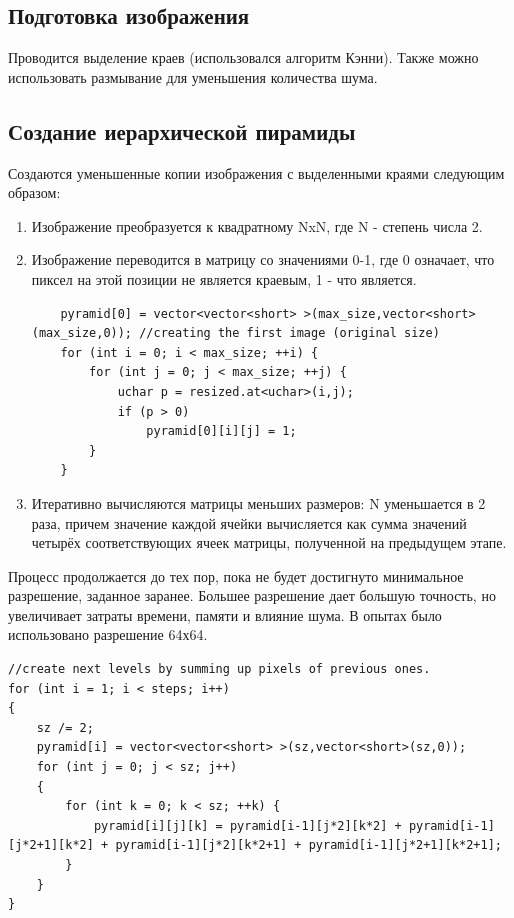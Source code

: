 \subsection{Подготовка изображения}
Проводится выделение краев (использовался алгоритм Кэнни). Также можно использовать размывание для уменьшения количества шума.
\subsection{Создание иерархической пирамиды}
Создаются уменьшенные копии изображения с выделенными краями следующим образом:
\begin{enumerate}
  \item Изображение преобразуется к квадратному NxN, где N - степень числа 2.
  \item Изображение переводится в матрицу со значениями 0-1, где 0 означает, что пиксел на этой позиции не является краевым, 1 - что является.

\begin{lstlisting}
    pyramid[0] = vector<vector<short> >(max_size,vector<short>(max_size,0)); //creating the first image (original size)
    for (int i = 0; i < max_size; ++i) {
        for (int j = 0; j < max_size; ++j) {
            uchar p = resized.at<uchar>(i,j);
            if (p > 0)
                pyramid[0][i][j] = 1;
        }
    }

\end{lstlisting}

\item Итеративно вычисляются матрицы меньших размеров: N уменьшается в 2 раза, причем значение каждой ячейки вычисляется как сумма значений четырёх соответствующих ячеек матрицы, полученной на предыдущем этапе.
\end{enumerate}
Процесс продолжается до тех пор, пока не будет достигнуто минимальное разрешение, заданное заранее. Большее разрешение дает большую точность, но увеличивает затраты времени, памяти и влияние шума. В опытах было использовано разрешение 64х64.

\begin{lstlisting}
//create next levels by summing up pixels of previous ones.
for (int i = 1; i < steps; i++)
{
    sz /= 2;
    pyramid[i] = vector<vector<short> >(sz,vector<short>(sz,0));
    for (int j = 0; j < sz; j++)
    {
        for (int k = 0; k < sz; ++k) {
            pyramid[i][j][k] = pyramid[i-1][j*2][k*2] + pyramid[i-1][j*2+1][k*2] + pyramid[i-1][j*2][k*2+1] + pyramid[i-1][j*2+1][k*2+1];
        }
    }
}
\end{lstlisting}
